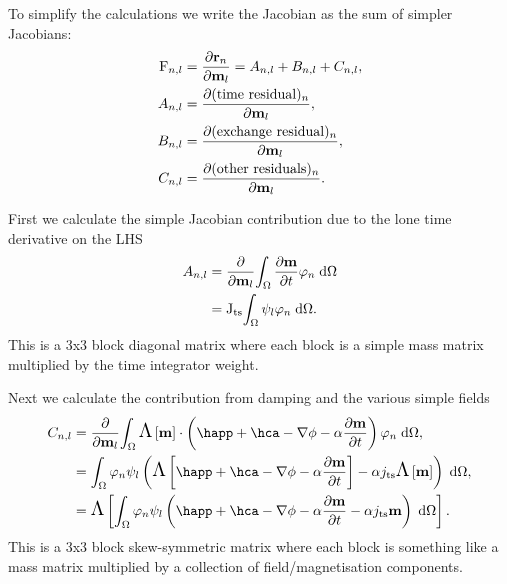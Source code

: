 To simplify the calculations we write the Jacobian as the sum of simpler Jacobians:
\begin{equation}
  \begin{aligned}
    \mathrm{F}_{n,l} &= \frac{\partial \mathbf{r}_n}{\partial \mathbf{m}_l} = A_{n,l} + B_{n,l} + C_{n,l}, \\
    A_{n,l} &= \frac{\partial (\text{time residual})_n}{\partial \mathbf{m}_l}, \\
    B_{n,l} &= \frac{\partial (\text{exchange residual})_n}{\partial \mathbf{m}_l}, \\
    C_{n,l} &= \frac{\partial (\text{other residuals})_n}{\partial \mathbf{m}_l}.
  \end{aligned}
\end{equation}


First we calculate the simple Jacobian contribution due to the lone time derivative on the LHS
\begin{equation}
  \begin{aligned}
    A_{n,l} &= \frac{\partial }{\partial \mathbf{m}_l} {\int_{\Omega}  \frac{\partial \mathbf{m}}{\partial t} \varphi_n  {\; \text{d}} {\Omega}} \\
           &= \mathrm{J}_\text{ts} {\int_{\Omega}  \psi_l \varphi_n {\; \text{d}}{\Omega}}.
  \end{aligned}
\end{equation}
This is a 3x3 block diagonal matrix where each block is a simple mass matrix multiplied by the time integrator weight.

Next we calculate the contribution from damping and the various simple fields
\begin{equation}
  \begin{aligned} 
    C_{n,l} &= \pd{}{\mv_l} \intd{  \skewm{\mv} \cdot
      \left( \happ + \hca - \nabla \phi - \dampc \dmdt
      \right) \tbf_n}, \\
    &= \intd{ \tbf_n \sbf_l \left( \skewm{\happ + \hca - \nabla \phi - \dampc \dmdt}
       - \dampc \jts \skewm{\mv}\right)}, \\
    &= \skewm{\intd{ \tbf_n  \sbf_l \left( \happ + \hca - \nabla \phi - \dampc \dmdt
       - \dampc \jts \mv \right) }}.
  \end{aligned}
\end{equation}
This is a 3x3 block skew-symmetric matrix where each block is something like a mass matrix multiplied by a collection of field/magnetisation components.

